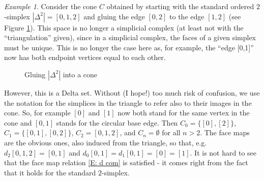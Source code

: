 \documentclass[12pt]{article}
\theoremstyle{plain}
\theoremstyle{definition}
\theoremstyle{remark}
\newtheorem{example}[theorem]{Example}
\begin{document}
\begin{example}\label{E: cone}
Consider the cone $C$ obtained by starting with the standard ordered $2$-simplex $|\Delta^2|=[0,1,2]$ and gluing the edge $[0,2]$ to the edge $[1,2]$ (see Figure \ref{F: fig6}). This space is no longer a simplicial complex (at least not with the ``triangulation'' given), since in a simplicial complex, the faces of a given simplex must be unique. This is no longer the case here as, for example, the ``edge [0,1]'' now has both endpoint vertices equal to each other. 


\begin{figure}[!htp]
\begin{center}
\end{center}
\caption{Gluing $|\Delta^2|$ into a cone}\label{F: fig6}
\end{figure}

However, this is a Delta set. Without (I hope!) too much risk of confusion, we use the notation for the simplices in the triangle to refer also to their images in the cone. So, for example $[0]$ and $[1]$ now both stand for the same vertex in the cone and $[0,1]$ stands for the circular base edge. Then $C_0=\{[0],[2]\}$, $C_1=\{[0,1], [0,2]\}$, $C_2=[0,1,2]$, and $C_n=\emptyset$ for all $n>2$. The face maps are the obvious ones, also induced from the triangle, so that, e.g. $d_2[0,1,2]=[0,1]$ and $d_0[0,1]=d_1[0,1]=[0]=[1]$. It is not hard to see that the face map relation \eqref{E: d com} is satisfied - it comes right from the fact that it holds for the standard $2$-simplex.
\end{example}  
\end{document}
